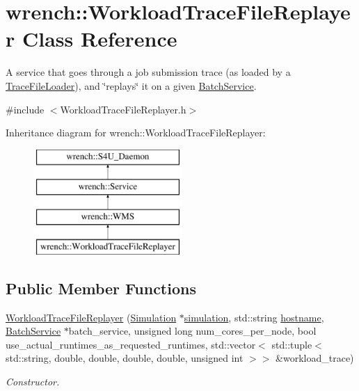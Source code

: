\hypertarget{classwrench_1_1_workload_trace_file_replayer}{}\section{wrench\+:\+:Workload\+Trace\+File\+Replayer Class Reference}
\label{classwrench_1_1_workload_trace_file_replayer}


A service that goes through a job submission trace (as loaded by a \hyperlink{classwrench_1_1_trace_file_loader}{Trace\+File\+Loader}), and \char`\"{}replays\char`\"{} it on a given \hyperlink{classwrench_1_1_batch_service}{Batch\+Service}.  




{\ttfamily \#include $<$Workload\+Trace\+File\+Replayer.\+h$>$}

Inheritance diagram for wrench\+:\+:Workload\+Trace\+File\+Replayer\+:\begin{figure}[H]
\begin{center}
\leavevmode
\includegraphics[height=4.000000cm]{classwrench_1_1_workload_trace_file_replayer}
\end{center}
\end{figure}
\subsection*{Public Member Functions}
\begin{DoxyCompactItemize}
\item 
\hyperlink{classwrench_1_1_workload_trace_file_replayer_abddae61ba16d8d18faf1767051d5c628}{Workload\+Trace\+File\+Replayer} (\hyperlink{classwrench_1_1_simulation}{Simulation} $\ast$\hyperlink{classwrench_1_1_s4_u___daemon_a305beca7ad2fb650ad1492b7c95e93c4}{simulation}, std\+::string \hyperlink{classwrench_1_1_s4_u___daemon_a52bc0b9a6cd248310749dac086819f00}{hostname}, \hyperlink{classwrench_1_1_batch_service}{Batch\+Service} $\ast$batch\+\_\+service, unsigned long num\+\_\+cores\+\_\+per\+\_\+node, bool use\+\_\+actual\+\_\+runtimes\+\_\+as\+\_\+requested\+\_\+runtimes, std\+::vector$<$ std\+::tuple$<$ std\+::string, double, double, double, double, unsigned int $>$$>$ \&workload\+\_\+trace)
\begin{DoxyCompactList}\small\item\em Constructor. \end{DoxyCompactList}\end{DoxyCompactItemize}
